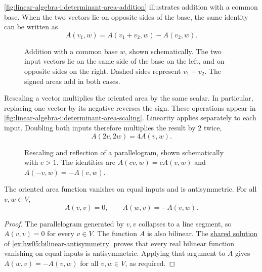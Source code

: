 \autoref{fig:linear-algebra-i:determinant-area-addition} illustrates
addition with a common base. When the two vectors lie on opposite sides
of the base, the same identity can be written as
\[
  A(v_1,w)=A(v_1+v_2,w)-A(v_2,w).
\]

\begin{figure}[htbp]
  \centering
  
  \caption[Addition of oriented areas with a common base]{Addition with a common base \(w\), shown schematically.
    The two input vectors lie on the same side of the base on the left,
    and on opposite sides on the right. Dashed sides represent \(v_1+v_2\).
    The signed areas add in both cases.}
  \label{fig:linear-algebra-i:determinant-area-addition}
\end{figure}

Rescaling a vector multiplies the oriented area by the same scalar.
In particular, replacing one vector by its negative reverses the sign.
These operations appear in
\autoref{fig:linear-algebra-i:determinant-area-scaling}.
Linearity applies separately to each input. Doubling both inputs therefore
multiplies the result by \(2\) twice,
\[
  A(2v,2w)=4A(v,w).
\]

\begin{figure}[htbp]
  \centering
  
  \caption[Rescaling and reflection of oriented area]{Rescaling and reflection of a parallelogram, shown schematically
    with \(c>1\). The identities are \(A(cv,w)=cA(v,w)\) and
    \(A(-v,w)=-A(v,w)\).}
  \label{fig:linear-algebra-i:determinant-area-scaling}
\end{figure}

\begin{proposition}
  \label{thm:linear-algebra-i:oriented-area-properties}
  The oriented area function vanishes on equal inputs and is antisymmetric.
  For all \(v,w\in V\),
  \[
    A(v,v)=0,\qquad A(w,v)=-A(v,w).
  \]
\end{proposition}

\begin{pendingreview}
\begin{proof}
  The parallelogram generated by \(v,v\) collapses to a line segment,
  so \(A(v,v)=0\) for every \(v\in V\). The function \(A\) is also
  bilinear. The \hyperref[sol:hw05:bilinear-antisymmetry]{shared solution}
  of \autoref{ex:hw05:bilinear-antisymmetry} proves that every real
  bilinear function vanishing on equal inputs is antisymmetric.
  Applying that argument to \(A\) gives \(A(w,v)=-A(v,w)\) for all
  \(v,w\in V\), as required.
\end{proof}
\end{pendingreview}

